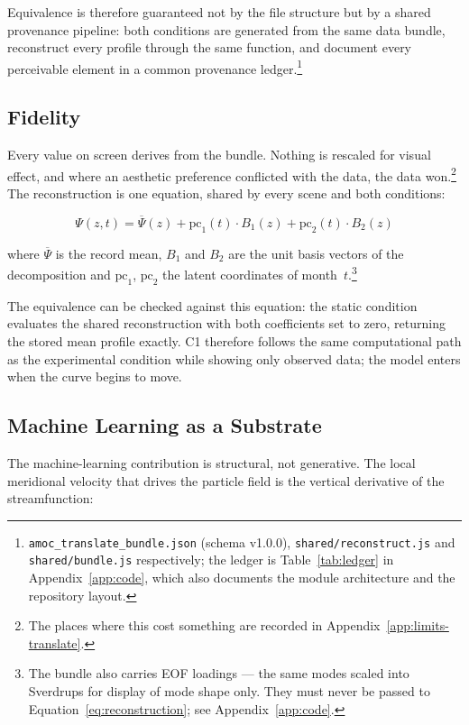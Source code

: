 Equivalence is therefore guaranteed not by the file structure but by a shared provenance pipeline: both conditions are generated from the same data bundle, reconstruct every profile through the same function, and document every perceivable element in a common provenance ledger.\footnote{\texttt{amoc\_translate\_bundle.json} (schema v1.0.0), \texttt{shared/reconstruct.js} and \texttt{shared/bundle.js} respectively; the ledger is Table~\ref{tab:ledger} in Appendix~\ref{app:code}, which also documents the module architecture and the repository layout.}

\subsection{Fidelity}
\label{subsec:fidelity}

Every value on screen derives from the bundle. Nothing is rescaled for visual effect, and where an aesthetic preference conflicted with the data, the data won.\footnote{The places where this cost something are recorded in Appendix~\ref{app:limits-translate}.} The reconstruction is one equation, shared by every scene and both conditions:

\begin{equation}
\label{eq:reconstruction}
\Psi(z, t) = \overline{\Psi}(z) + \mathrm{pc}_1(t) \cdot B_1(z) + \mathrm{pc}_2(t) \cdot B_2(z)
\end{equation}

where $\overline{\Psi}$ is the record mean, $B_1$ and $B_2$ are the unit basis vectors of the decomposition and $\mathrm{pc}_1$, $\mathrm{pc}_2$ the latent coordinates of month~$t$.\footnote{The bundle also carries EOF loadings --- the same modes scaled into Sverdrups for display of mode shape only. They must never be passed to Equation~\ref{eq:reconstruction}; see Appendix~\ref{app:code}.}

The equivalence can be checked against this equation: the static condition evaluates the shared reconstruction with both coefficients set to zero, returning the stored mean profile exactly. C1 therefore follows the same computational path as the experimental condition while showing only observed data; the model enters when the curve begins to move.

\subsection{Machine Learning as a Substrate}
\label{subsec:ml-role}

The machine-learning contribution is structural, not generative. The local meridional velocity that drives the particle field is the vertical derivative of the streamfunction:

